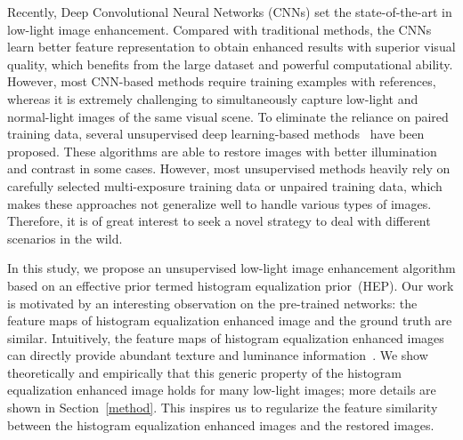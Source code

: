 \documentclass[journal]{IEEEtran}
\begin{document}
Recently, Deep Convolutional Neural Networks (CNNs) set the state-of-the-art in low-light image enhancement. Compared with traditional methods, the CNNs learn better feature representation to obtain enhanced results with superior visual quality, which benefits from the large dataset and powerful computational ability. However, most CNN-based methods require training examples with references, whereas it is extremely challenging to simultaneously capture low-light and normal-light images of the same visual scene. To eliminate the reliance on paired training data, several unsupervised deep learning-based methods~\cite{guo2020zero,zhang2020self,jiang2021enlightengan} have been proposed. These algorithms are able to restore images with better illumination and contrast in some cases. However, most unsupervised methods heavily rely on carefully selected multi-exposure training data or unpaired training data, which makes these approaches not generalize well to handle various types of images. Therefore, it is of great interest to seek a novel strategy to deal with different scenarios in the wild.

In this study, we propose an unsupervised low-light image enhancement algorithm based on an effective prior termed histogram equalization prior~(HEP). Our work is motivated by an interesting observation on the pre-trained networks: the feature maps of histogram equalization enhanced image and the ground truth are similar. Intuitively, the feature maps of histogram equalization enhanced images can directly provide abundant texture and luminance information~\cite{geirhos2018imagenet}. We show theoretically and empirically that this generic property of the histogram equalization enhanced image holds for many low-light images; more details are shown in Section~\ref{method}. This inspires us to regularize the feature similarity between the histogram equalization enhanced images and the restored images. 
\end{document}

